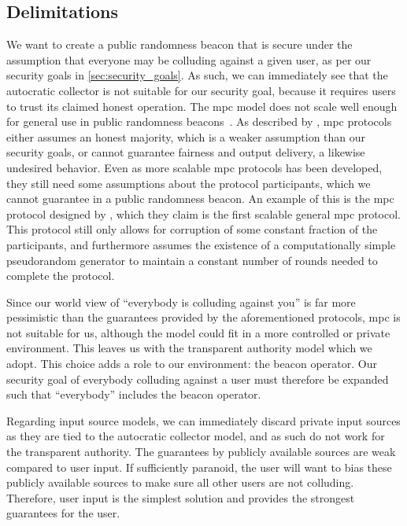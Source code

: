 \subsection{Delimitations}%
\label{sub:delimitations}
We want to create a public randomness beacon that is secure under the assumption that everyone may be colluding against a given user, as per our security goals in \cref{sec:security_goals}.
As such, we can immediately see that the autocratic collector is not suitable for our security goal, because it requires users to trust its claimed honest operation.
The \gls{mpc} model does not scale well enough for general use in public randomness beacons~\cite{syta2017scalable}.
As described by \citet{damgaard2006scalable}, \gls{mpc} protocols either assumes an honest majority, which is a weaker assumption than our security goals, or cannot guarantee fairness and output delivery, a likewise undesired behavior.
Even as more scalable \gls{mpc} protocols has been developed, they still need some assumptions about the protocol participants, which we cannot guarantee in a public randomness beacon.
An example of this is the \gls{mpc} protocol designed by \citet{damgaard2006scalable}, which they claim is the first scalable general \gls{mpc} protocol.
This protocol still only allows for corruption of some constant fraction of the participants, and furthermore assumes the existence of a computationally simple pseudorandom generator to maintain a constant number of rounds needed to complete the protocol.

Since our world view of \enquote{everybody is colluding against you} is far more pessimistic than the guarantees provided by the aforementioned protocols, \gls{mpc} is not suitable for us, although the model could fit in a more controlled or private environment.
This leaves us with the transparent authority model which we adopt.
This choice adds a role to our environment: the beacon operator.
Our security goal of everybody colluding against a user must therefore be expanded such that \enquote{everybody} includes the beacon operator.

Regarding input source models, we can immediately discard private input sources as they are tied to the autocratic collector model, and as such do not work for the transparent authority.
The guarantees by publicly available sources are weak compared to user input.
If sufficiently paranoid, the user will want to bias these publicly available sources to make sure all other users are not colluding.
Therefore, user input is the simplest solution and provides the strongest guarantees for the user.


